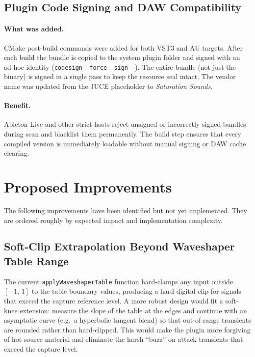 \documentclass[11pt, letterpaper]{article}
\begin{document}
\subsection{Plugin Code Signing and DAW Compatibility}

\paragraph{What was added.}
CMake post-build commands were added for both VST3 and AU targets.  After each
build the bundle is copied to the system plugin folder and signed with an
ad-hoc identity (\texttt{codesign --force --sign -}).  The entire bundle (not
just the binary) is signed in a single pass to keep the resource seal intact.
The vendor name was updated from the JUCE placeholder to
\emph{Saturation Sounds}.

\paragraph{Benefit.}
Ableton Live and other strict hosts reject unsigned or incorrectly signed
bundles during scan and blacklist them permanently.  The build step ensures
that every compiled version is immediately loadable without manual signing or
DAW cache clearing.

\section{Proposed Improvements}
\label{sec:proposed}

The following improvements have been identified but not yet implemented.  They
are ordered roughly by expected impact and implementation complexity.

\subsection{Soft-Clip Extrapolation Beyond Waveshaper Table Range}

The current \texttt{applyWaveshaperTable} function hard-clamps any input
outside $[-1,\,1]$ to the table boundary values, producing a hard digital clip
for signals that exceed the capture reference level.  A more robust design
would fit a soft-knee extension: measure the slope of the table at the edges
and continue with an asymptotic curve (e.g.\ a hyperbolic tangent blend) so
that out-of-range transients are rounded rather than hard-clipped.  This would
make the plugin more forgiving of hot source material and eliminate the harsh
``buzz'' on attack transients that exceed the capture level.
\end{document}
